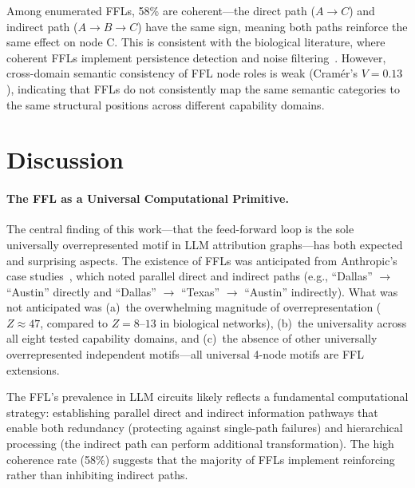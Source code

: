 \documentclass[11pt,letterpaper]{article}
\begin{document}
Among enumerated FFLs, 58\% are coherent---the direct path ($A \to C$) and indirect path ($A \to B \to C$) have the same sign, meaning both paths reinforce the same effect on node C. This is consistent with the biological literature, where coherent FFLs implement persistence detection and noise filtering~\citep{ShenOrr2002, Alon2007}. However, cross-domain semantic consistency of FFL node roles is weak (Cram\'{e}r's $V = 0.13$), indicating that FFLs do not consistently map the same semantic categories to the same structural positions across different capability domains.

\section{Discussion}
\label{sec:discussion}

\paragraph{The FFL as a Universal Computational Primitive.}
The central finding of this work---that the feed-forward loop is the sole universally overrepresented motif in LLM attribution graphs---has both expected and surprising aspects. The existence of FFLs was anticipated from Anthropic's case studies~\citep{Anthropic2025}, which noted parallel direct and indirect paths (e.g., ``Dallas'' $\to$ ``Austin'' directly and ``Dallas'' $\to$ ``Texas'' $\to$ ``Austin'' indirectly). What was not anticipated was (a)~the overwhelming magnitude of overrepresentation ($Z \approx 47$, compared to $Z = 8$--$13$ in biological networks), (b)~the universality across all eight tested capability domains, and (c)~the absence of other universally overrepresented independent motifs---all universal 4-node motifs are FFL extensions.

The FFL's prevalence in LLM circuits likely reflects a fundamental computational strategy: establishing parallel direct and indirect information pathways that enable both redundancy (protecting against single-path failures) and hierarchical processing (the indirect path can perform additional transformation). The high coherence rate (58\%) suggests that the majority of FFLs implement reinforcing rather than inhibiting indirect paths.
\end{document}

